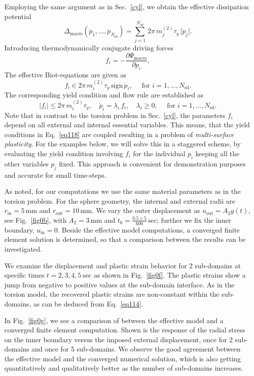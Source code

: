 \documentclass[final,1p,times]{elsarticle}
\newcommand{\be}{\begin{equation}}
\newcommand{\ee}{\end{equation}}
\newcommand{\gjcmt}[1]{{\color{cyan}[#1]}~}
\begin{document}
Employing the same argument as in Sec.\ \ref{cyl}, we obtain the effective dissipation potential
\be
\label{eq115}
\Delta_\mathrm{macro}(\dot p_1,\ldots,\dot p_{N_\mathrm{sd}} ) 
= \sum_{j=1}^{N_\mathrm{sd}}\,2\pi \, m^{(2)}_j \tau_y \, \vert \dot p_j \vert.
\ee
Introducing thermodynamically conjugate driving forces
\be
\label{eq116}
f_i = - \frac{\partial \Psi_\mathrm{macro}}{\partial p_i},
\ee
The effective Biot-equations are given as
\be
\label{eq117}
f_i \in 2\pi \, m^{(2)}_i \tau_y \, \mathrm{sign} \, \dot p_i, \quad \text{ for } i = 1,\ldots,N_\mathrm{sd}.
\ee
The corresponding yield condition and flow rule are established as
\be
\label{eq118}
\left| f_i \right| \le 2\pi \, m^{(2)}_i \tau_y, \quad \dot p_i = \lambda_i \, f_i, \quad \lambda_i \ge 0, \quad \text{ for } i = 1,\ldots,N_\mathrm{sd}.
\ee
Note that in contrast to the torsion problem in Sec.\ \ref{cyl}, the parameters $f_i$ depend on all external and internal essential variables. This means, that the yield conditions in Eq.\ \eqref{eq118} are coupled resulting in a problem of \textit{multi-surface plasticity}. For the examples below, we will solve this in a staggered scheme, by evaluating the yield condition involving $f_i$ for the individual $p_i$ keeping all the other variables $p_j$ fixed. This approach is convenient for demonstration purposes and accurate for small time-steps.

As noted, for our computations we use the same material parameters as in the torsion problem. For the sphere geometry, the internal and external radii are $r_\mathrm{in}=5 \,\mathrm{mm}$ and $r_\mathrm{out}=10 \,\mathrm{mm}$.
We vary the outer displacement as $u_\mathrm{out} = A_2 g(t)$, see Fig.~\ref{fig0b}, with $A_2= 3\, \mathrm{mm}$ and $t_0 = \frac{0.5\times 5}{600}\, \mathrm{sec}$; further we fix the inner boundary,  $u_\mathrm{in}=0$. 
Beside the effective model computations, a converged finite element solution is determined, so that a comparison between the results can be investigated.


We examine the displacement and plastic strain behavior for 2 sub-domains at specific times $t=2, 3, 4, 5~\mathrm{sec}$ as shown in  Fig.~\ref{fig0f}.
The plastic strains show a jump from negative to positive values at the sub-domain interface. As in the torsion model, the recovered plastic strains are non-constant within the sub-domains, as can be deduced from Eq.\ \eqref{eq114}.

In Fig.~\ref{fig0g}, we see a comparison of between the effective model and a converged finite element computation.  Shown is the response of the radial stress on the inner boundary versus the imposed external displacement, once for 2 sub-domains and once for 5 sub-domains. We observe the good agreement between the effective model and the converged numerical solution, which is also getting quantitatively and qualitatively better as the number of sub-domains increases.
\end{document}
